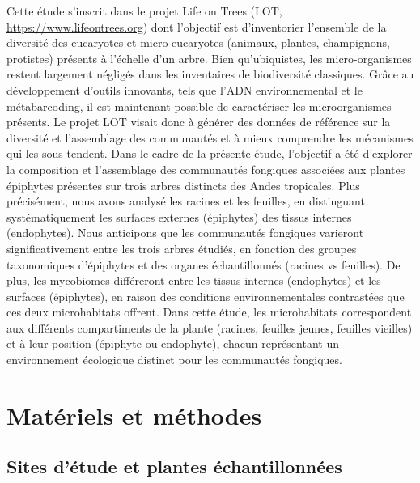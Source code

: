 \documentclass[a4paper,12pt]{article}
\begin{document}
Cette étude s’inscrit dans le projet Life on Trees (LOT, \url{https://www.lifeontrees.org}) dont l’objectif est d’inventorier l’ensemble de la diversité des eucaryotes et micro-eucaryotes (animaux, plantes, champignons, protistes) présents à l’échelle d’un arbre. Bien qu’ubiquistes, les micro-organismes restent largement négligés dans les inventaires de biodiversité classiques. Grâce au développement d’outils innovants, tels que l’ADN environnemental et le métabarcoding, il est maintenant possible de caractériser les microorganismes présents. 
Le projet LOT visait donc à générer des données de référence sur la diversité et l’assemblage des communautés et à mieux comprendre les mécanismes qui les sous-tendent. Dans le cadre de la présente étude, l’objectif a été d’explorer la composition et l’assemblage des communautés fongiques associées aux plantes épiphytes présentes sur trois arbres distincts des Andes tropicales. Plus précisément, nous avons analysé les racines et les feuilles, en distinguant systématiquement les surfaces externes (épiphytes) des tissus internes (endophytes). Nous anticipons que les communautés fongiques varieront significativement entre les trois arbres étudiés, en fonction des groupes taxonomiques d’épiphytes et des organes échantillonnés (racines vs feuilles). De plus, les mycobiomes différeront entre les tissus internes (endophytes)  et les surfaces (épiphytes), en raison des conditions environnementales contrastées que ces deux microhabitats offrent. 
Dans cette étude, les microhabitats correspondent aux différents compartiments de la plante (racines, feuilles jeunes, feuilles vieilles) et à leur position (épiphyte ou endophyte), chacun représentant un environnement écologique distinct pour les communautés fongiques.



\section{Matériels et méthodes}

\subsection{Sites d'étude et plantes échantillonnées}
\end{document}
